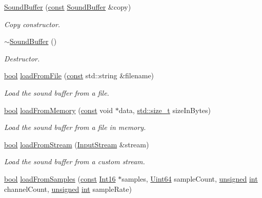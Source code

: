 \begin{DoxyCompactItemize}
\hyperlink{classsf_1_1_sound_buffer_aaf000fc741ff27015907e8588263f4a6}{Sound\-Buffer} (\hyperlink{term__entry_8h_a57bd63ce7f9a353488880e3de6692d5a}{const} \hyperlink{classsf_1_1_sound_buffer}{Sound\-Buffer} \&copy)
\begin{DoxyCompactList}\small\item\em Copy constructor. \end{DoxyCompactList}\item 
\hyperlink{classsf_1_1_sound_buffer_aea240161724ffba74a0d6a9e277d3cd5}{$\sim$\-Sound\-Buffer} ()
\begin{DoxyCompactList}\small\item\em Destructor. \end{DoxyCompactList}\item 
\hyperlink{term__entry_8h_a002004ba5d663f149f6c38064926abac}{bool} \hyperlink{classsf_1_1_sound_buffer_a2be6a8025c97eb622a7dff6cf2594394}{load\-From\-File} (\hyperlink{term__entry_8h_a57bd63ce7f9a353488880e3de6692d5a}{const} std\-::string \&filename)
\begin{DoxyCompactList}\small\item\em Load the sound buffer from a file. \end{DoxyCompactList}\item 
\hyperlink{term__entry_8h_a002004ba5d663f149f6c38064926abac}{bool} \hyperlink{classsf_1_1_sound_buffer_af8cfa5599739a7edae69c5cba273d33f}{load\-From\-Memory} (\hyperlink{term__entry_8h_a57bd63ce7f9a353488880e3de6692d5a}{const} void $\ast$data, \hyperlink{nc__alloc_8h_a7b60c5629e55e8ec87a4547dd4abced4}{std\-::size\-\_\-t} size\-In\-Bytes)
\begin{DoxyCompactList}\small\item\em Load the sound buffer from a file in memory. \end{DoxyCompactList}\item 
\hyperlink{term__entry_8h_a002004ba5d663f149f6c38064926abac}{bool} \hyperlink{classsf_1_1_sound_buffer_ad292156b1e01f6dabd4c0c277d5e079e}{load\-From\-Stream} (\hyperlink{classsf_1_1_input_stream}{Input\-Stream} \&stream)
\begin{DoxyCompactList}\small\item\em Load the sound buffer from a custom stream. \end{DoxyCompactList}\item 
\hyperlink{term__entry_8h_a002004ba5d663f149f6c38064926abac}{bool} \hyperlink{classsf_1_1_sound_buffer_a42d51ce4bb3b60c7ea06f63c273fd063}{load\-From\-Samples} (\hyperlink{term__entry_8h_a57bd63ce7f9a353488880e3de6692d5a}{const} \hyperlink{namespacesf_a3c8e10435e2a310a7741755e66b5c94e}{Int16} $\ast$samples, \hyperlink{namespacesf_add9ac83466d96b9f50a009b9f4064266}{Uint64} sample\-Count, \hyperlink{curses_8priv_8h_aca40206900cfc164654362fa8d4ad1e6}{unsigned} \hyperlink{term__entry_8h_ad65b480f8c8270356b45a9890f6499ae}{int} channel\-Count, \hyperlink{curses_8priv_8h_aca40206900cfc164654362fa8d4ad1e6}{unsigned} \hyperlink{term__entry_8h_ad65b480f8c8270356b45a9890f6499ae}{int} sample\-Rate)

\end{DoxyCompactItemize}
